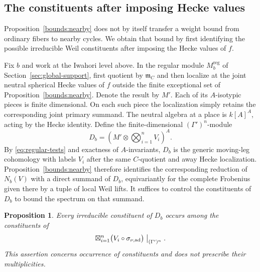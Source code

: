 \documentclass[11pt]{article}
\numberwithin{equation}{section}
\newtheorem{proposition}[theorem]{Proposition}
\theoremstyle{definition}
\theoremstyle{remark}
\begin{document}
\subsection{The constituents after imposing Hecke values}

Proposition~\ref{bounds:nearby} does not by itself transfer a weight
bound from ordinary fibers to nearby cycles.  We obtain that bound by
first identifying the possible irreducible Weil constituents after
imposing the Hecke values of $f$.

Fix $b$ and work at the Iwahori level above.  In the regular module
$M_b^{\mathrm{reg}}$ of Section~\ref{sec:global-support}, first quotient
by $\mathfrak m_C$ and then localize at the joint neutral spherical
Hecke values of $f$ outside the finite exceptional set of
Proposition~\ref{bounds:nearby}.  Denote the result by $M'$.  Each of its
$A$-isotypic pieces is finite dimensional.  On each such piece the
localization simply retains the corresponding joint primary summand.
The neutral algebra at a place is $k[A]^A$, acting by the Hecke
identity.  Define the finite-dimensional $(\Gamma')^n$-module
\[
 D_b=\left(M'\otimes\bigotimes_{i=1}^n V_i\right)^A.
\]
By \eqref{eq:regular-tests} and exactness of $A$-invariants, $D_b$
is the generic moving-leg cohomology with labels $V_i$ after the same
$C$-quotient and away Hecke localization.  Proposition~\ref{bounds:nearby}
therefore identifies the corresponding reduction of $N_b(V)$ with
a direct summand of $D_b$, equivariantly for the complete Frobenius
given there by a tuple of local Weil lifts.  It suffices to control
the constituents of $D_b$ to bound the spectrum on that summand.

\begin{proposition}\label{bounds:constituent-inclusion}
Every irreducible constituent of $D_b$ occurs among the constituents of
\begin{equation}
 \boxtimes_{i=1}^n\bigl(V_i\circ\sigma_{\nu,\mathrm{ad}}\bigr)
 \bigm|_{(\Gamma')^n}.
 \label{eq:constituents}
\end{equation}
This assertion concerns occurrence of constituents and does not
prescribe their multiplicities.
\end{proposition}
\end{document}
